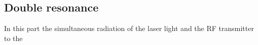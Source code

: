 \documentclass{article}
\begin{document}
\subsection{Double resonance}
In this part the simultaneous radiation of the laser light and the RF transmitter to the
\end{document}
